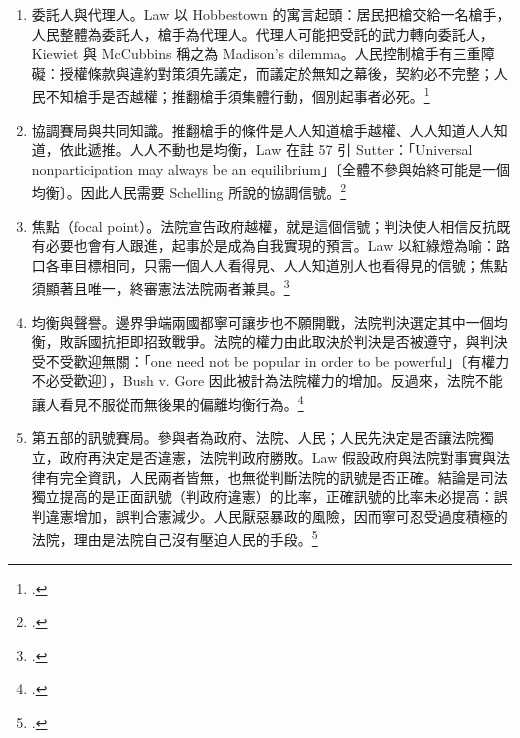 \begin{enumerate}
\tightlist
\item
  委託人與代理人。Law 以 Hobbestown 的寓言起頭：居民把槍交給一名槍手，人民整體為委託人，槍手為代理人。代理人可能把受託的武力轉向委託人，Kiewiet 與 McCubbins 稱之為 Madison's dilemma。人民控制槍手有三重障礙：授權條款與違約對策須先議定，而議定於無知之幕後，契約必不完整；人民不知槍手是否越權；推翻槍手須集體行動，個別起事者必死。\footcite[737--741]{law2009}
\item
  協調賽局與共同知識。推翻槍手的條件是人人知道槍手越權、人人知道人人知道，依此遞推。人人不動也是均衡，Law 在註 57 引 Sutter：「Universal nonparticipation may always be an equilibrium」〔全體不參與始終可能是一個均衡〕。因此人民需要 Schelling 所說的協調信號。\footcite[742]{law2009}
\item
  焦點（focal point）。法院宣告政府越權，就是這個信號；判決使人相信反抗既有必要也會有人跟進，起事於是成為自我實現的預言。Law 以紅綠燈為喻：路口各車目標相同，只需一個人人看得見、人人知道別人也看得見的信號；焦點須顯著且唯一，終審憲法法院兩者兼具。\footcite[744, 770--775]{law2009}
\item
  均衡與聲譽。邊界爭端兩國都寧可讓步也不願開戰，法院判決選定其中一個均衡，敗訴國抗拒即招致戰爭。法院的權力由此取決於判決是否被遵守，與判決受不受歡迎無關：「one need not be popular in order to be powerful」〔有權力不必受歡迎〕，Bush v. Gore 因此被計為法院權力的增加。反過來，法院不能讓人看見不服從而無後果的偏離均衡行為。\footcite[759--760, 780--782]{law2009}
\item
  第五部的訊號賽局。參與者為政府、法院、人民；人民先決定是否讓法院獨立，政府再決定是否違憲，法院判政府勝敗。Law 假設政府與法院對事實與法律有完全資訊，人民兩者皆無，也無從判斷法院的訊號是否正確。結論是司法獨立提高的是正面訊號（判政府違憲）的比率，正確訊號的比率未必提高：誤判違憲增加，誤判合憲減少。人民厭惡暴政的風險，因而寧可忍受過度積極的法院，理由是法院自己沒有壓迫人民的手段。\footcite[787--790]{law2009}
\end{enumerate}

